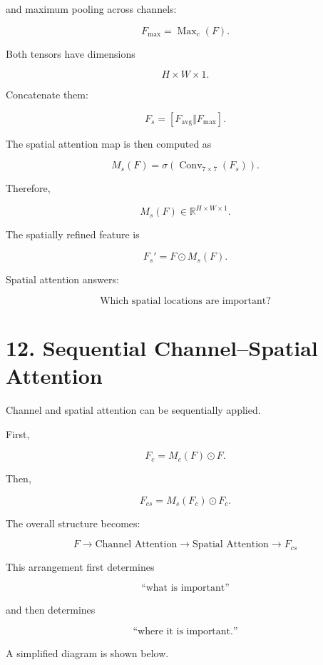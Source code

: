\documentclass[10pt]{article}
\begin{document}
and maximum pooling across channels:

\[
F_{\mathrm{max}}
=
\operatorname{Max}_{c}(F).
\]

Both tensors have dimensions

\[
H\times W\times1.
\]

Concatenate them:

\[
F_s
=
[
F_{\mathrm{avg}}
\Vert
F_{\mathrm{max}}
].
\]

The spatial attention map is then computed as

\[
M_s(F)
=
\sigma
\left(
\operatorname{Conv}_{7\times7}(F_s)
\right).
\]

Therefore,

\[
M_s(F)
\in
\mathbb{R}^{H\times W\times1}.
\]

The spatially refined feature is

\[
F_s'
=
F\odot M_s(F).
\]

Spatial attention answers:

\[
\boxed{\text{Which spatial locations are important?}}
\]

\section*{12. Sequential Channel--Spatial Attention}

Channel and spatial attention can be sequentially applied.

First,

\[
F_c
=
M_c(F)\odot F.
\]

Then,

\[
F_{cs}
=
M_s(F_c)\odot F_c.
\]

The overall structure becomes:

\[
\boxed{
F
\rightarrow
\text{Channel Attention}
\rightarrow
\text{Spatial Attention}
\rightarrow
F_{cs}
}
\]

This arrangement first determines

\[
\text{``what is important''}
\]

and then determines

\[
\text{``where it is important.''}
\]

A simplified diagram is shown below.
\end{document}

